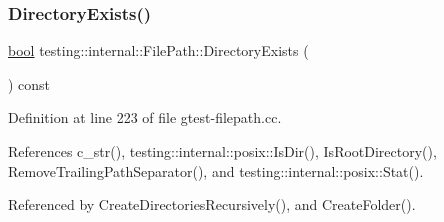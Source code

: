 \mbox{\label{classtesting_1_1internal_1_1FilePath_a74ba8435e822d77f79f137c38de9bfeb}} 
\subsubsection{\texorpdfstring{Directory\+Exists()}{DirectoryExists()}}
{\footnotesize\ttfamily \hyperlink{classbool}{bool} testing\+::internal\+::\+File\+Path\+::\+Directory\+Exists (\begin{DoxyParamCaption}{ }\end{DoxyParamCaption}) const}



Definition at line 223 of file gtest-\/filepath.\+cc.



References c\+\_\+str(), testing\+::internal\+::posix\+::\+Is\+Dir(), Is\+Root\+Directory(), Remove\+Trailing\+Path\+Separator(), and testing\+::internal\+::posix\+::\+Stat().



Referenced by Create\+Directories\+Recursively(), and Create\+Folder().


